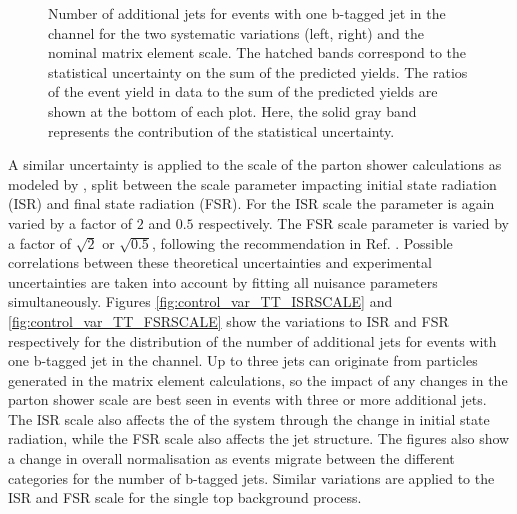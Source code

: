 \begin{figure}[htbp!]
\begin{center}
\caption{Number of additional jets for events with one b-tagged jet in the \emu channel for the two systematic variations (left, right) and the nominal \ttbar matrix element scale.
The hatched bands correspond to the statistical uncertainty on the sum of the predicted yields. 
        The ratios of the event yield in data to the sum of the predicted yields are
        shown at the bottom of each plot. Here, the solid gray band
        represents the contribution of the statistical uncertainty.
  \label{fig:control_var_TT_MESCALE}}
  \end{center}
\end{figure}

A similar uncertainty is applied to the scale of the parton shower calculations as modeled by , split between the scale parameter impacting initial state radiation (ISR) and final state radiation (FSR). 
For the ISR scale the parameter is again varied by a factor of $2$ and $0.5$ respectively. The FSR scale parameter is varied by a factor of $\sqrt{2}$ or $\sqrt{0.5}$, following the recommendation
in Ref. \cite{Skands:2014pea}. 
Possible correlations between these theoretical uncertainties and  experimental uncertainties 
are taken into account by fitting all nuisance parameters simultaneously.
Figures \ref{fig:control_var_TT_ISRSCALE}
and \ref{fig:control_var_TT_FSRSCALE} show the variations to ISR and FSR respectively for the distribution of the number of additional jets for events with one b-tagged jet in the \emu channel.
Up to three jets can originate from particles generated in the matrix element calculations, so the impact of any changes in the parton shower scale are best seen in events with three or more additional jets.
The ISR scale also affects the \pt of the \ttbar system through the change in initial state radiation, while the FSR scale also affects the jet structure.
The figures also show a change in overall normalisation as events migrate between the different categories for the number of b-tagged jets.
Similar variations are applied to the ISR and FSR scale for the single top background process.

